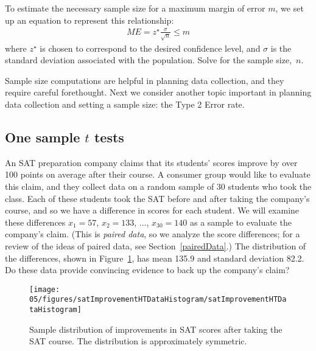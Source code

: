\begin{termBox}{
To estimate the necessary sample size for a maximum margin of error $m$, we set up an equation to represent this relationship:
\begin{align*}
ME = z^{\star}\frac{\sigma}{\sqrt{n}} \leq m 
\end{align*}
where $z^{\star}$ is chosen to correspond to the desired confidence level, and $\sigma$ is the standard deviation associated with the population. Solve for the sample size,~$n$.}
\end{termBox}

Sample size computations are helpful in planning data collection, and they require careful forethought. Next we consider another topic important in planning data collection and setting a sample size: the Type 2 Error rate.




\subsection{One sample $t$ tests}
\label{oneSampleTTests}


An SAT preparation company claims that its students' scores improve by over 100 points on average after their course. A consumer group would like to evaluate this claim, and they collect data on a random sample of 30 students who took the class. Each of these students took the SAT before and after taking the company's course, and so we have a difference in scores for each student. We will examine these differences $x_1=57$, $x_2=133$, ..., $x_{30}=140$ as a sample to evaluate the company's claim. 
(This is \emph{paired data}, so we analyze the score differences; for a review of the ideas of paired data, see Section~\ref{pairedData}.) 
The distribution of the differences, shown in Figure~\ref{satImprovementHTDataHistogram}, has mean 135.9 and standard deviation 82.2. Do these data provide convincing evidence to back up the company's claim? 

\begin{figure}[h]
\centering
\texttt{[image: 05/figures/satImprovementHTDataHistogram/satImprovementHTDataHistogram]}
\caption{Sample distribution of improvements in SAT scores after taking the SAT course. The distribution is approximately symmetric.}
\label{satImprovementHTDataHistogram}
\end{figure}

